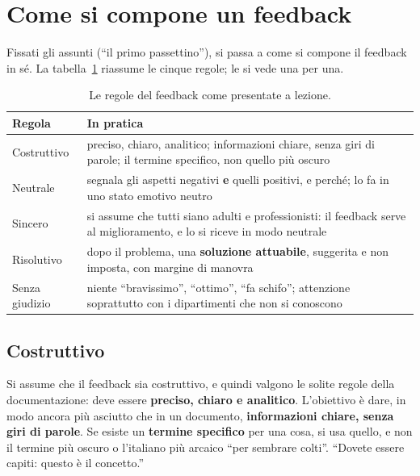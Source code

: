 \section{Come si compone un feedback}
\label{gd10:sec:comporre}



Fissati gli assunti (``il primo passettino''), si passa a come si compone il
feedback in sé. La tabella~\ref{gd10:tab:regole} riassume le cinque regole;
le si vede una per una.

\begin{table}[htbp]
  \centering
  \caption{Le regole del feedback come presentate a lezione.}
  \label{gd10:tab:regole}
  \small
  \begin{tabular}{@{}p{}p{}@{}}
    \toprule
    \textbf{Regola} & \textbf{In pratica} \\
    \midrule
    Costruttivo & preciso, chiaro, analitico; informazioni chiare, senza
      giri di parole; il termine specifico, non quello più oscuro \\
    \addlinespace
    Neutrale & segnala gli aspetti negativi \textbf{e} quelli positivi, e
      perché; lo fa in uno stato emotivo neutro \\
    \addlinespace
    Sincero & si assume che tutti siano adulti e professionisti: il
      feedback serve al miglioramento, e lo si riceve in modo neutrale \\
    \addlinespace
    Risolutivo & dopo il problema, una \textbf{soluzione attuabile},
      suggerita e non imposta, con margine di manovra \\
    \addlinespace
    Senza giudizio & niente ``bravissimo'', ``ottimo'', ``fa schifo'';
      attenzione soprattutto con i dipartimenti che non si conoscono \\
    \bottomrule
  \end{tabular}
\end{table}

\subsection{Costruttivo}

Si assume che il feedback sia costruttivo, e quindi valgono le solite regole
della documentazione: deve essere \textbf{preciso, chiaro e analitico}.
L'obiettivo è dare, in modo ancora più asciutto che in un documento,
\textbf{informazioni chiare, senza giri di parole}. Se esiste un
\textbf{termine specifico} per una cosa, si usa quello, e non il termine più
oscuro o l'italiano più arcaico ``per sembrare colti''. ``Dovete essere
capiti: questo è il concetto.''

